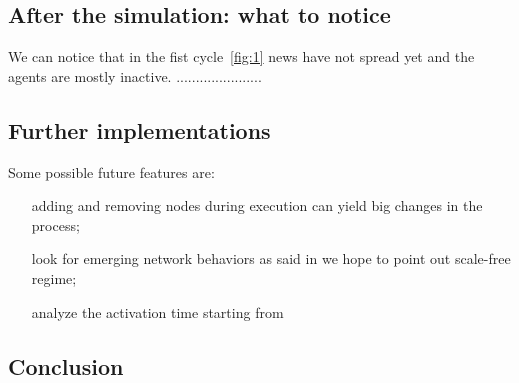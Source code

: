 \subsection{After the simulation: what to notice}\label{subsec:after}
We can notice that in the fist cycle~\ref{fig:1} news have not spread yet and the agents are mostly inactive. ......................

\subsection{Further implementations}\label{subsec:implementations}
Some possible future features are:
\begin{itemize}
\item [adding and removing nodes during execution] can yield big changes
  in the process;
\item [look for emerging network behaviors] as said in \textit{} we hope to point out scale-free regime;
\item [analyze the activation time] starting from \cite{goh_burstiness_2008}
\end{itemize}

\subsection{Conclusion}\label{subsec:conclusion}






